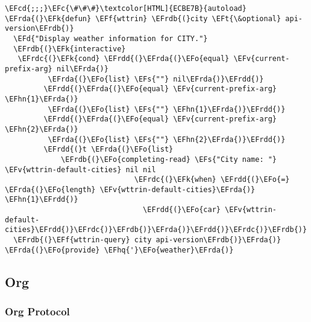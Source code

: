 \documentclass[a4wide,10pt]{article}
\newcommand{\EFc}[1]{\textcolor{EFc}{#1}} %
\newcommand{\EFcd}[1]{\textcolor{EFcd}{#1}} %
\newcommand{\EFs}[1]{\textcolor{EFs}{#1}} %
\newcommand{\EFd}[1]{\textcolor{EFd}{#1}} %
\newcommand{\EFk}[1]{\textcolor{EFk}{#1}} %
\newcommand{\EFf}[1]{\textcolor{EFf}{#1}} %
\newcommand{\EFv}[1]{\textcolor{EFv}{#1}} %
\newcommand{\EFt}[1]{\textcolor{EFt}{#1}} %
\newcommand{\EFo}[1]{\textcolor{EFo}{#1}} %
\newcommand{\EFhn}[1]{\textcolor{EFhn}{\textbf{#1}}} %
\newcommand{\EFhq}[1]{\textcolor{EFhq}{#1}} %
\newcommand{\EFrda}[1]{\textcolor{EFrda}{#1}} %
\newcommand{\EFrdb}[1]{\textcolor{EFrdb}{#1}} %
\newcommand{\EFrdc}[1]{\textcolor{EFrdc}{#1}} %
\newcommand{\EFrdd}[1]{\textcolor{EFrdd}{#1}} %
\begin{document}
\begin{Code}
\begin{Verbatim}
\EFcd{;;;}\EFc{\#\#\#}\textcolor[HTML]{ECBE7B}{autoload}
\EFrda{(}\EFk{defun} \EFf{wttrin} \EFrdb{(}city \EFt{\&optional} api-version\EFrdb{)}
  \EFd{"Display weather information for CITY."}
  \EFrdb{(}\EFk{interactive}
   \EFrdc{(}\EFk{cond} \EFrdd{(}\EFrda{(}\EFo{equal} \EFv{current-prefix-arg} nil\EFrda{)}
          \EFrda{(}\EFo{list} \EFs{""} nil\EFrda{)}\EFrdd{)}
         \EFrdd{(}\EFrda{(}\EFo{equal} \EFv{current-prefix-arg} \EFhn{1}\EFrda{)}
          \EFrda{(}\EFo{list} \EFs{""} \EFhn{1}\EFrda{)}\EFrdd{)}
         \EFrdd{(}\EFrda{(}\EFo{equal} \EFv{current-prefix-arg} \EFhn{2}\EFrda{)}
          \EFrda{(}\EFo{list} \EFs{""} \EFhn{2}\EFrda{)}\EFrdd{)}
         \EFrdd{(}t \EFrda{(}\EFo{list}
             \EFrdb{(}\EFo{completing-read} \EFs{"City name: "} \EFv{wttrin-default-cities} nil nil
                              \EFrdc{(}\EFk{when} \EFrdd{(}\EFo{=} \EFrda{(}\EFo{length} \EFv{wttrin-default-cities}\EFrda{)} \EFhn{1}\EFrdd{)}
                                \EFrdd{(}\EFo{car} \EFv{wttrin-default-cities}\EFrdd{)}\EFrdc{)}\EFrdb{)}\EFrda{)}\EFrdd{)}\EFrdc{)}\EFrdb{)}
  \EFrdb{(}\EFf{wttrin-query} city api-version\EFrdb{)}\EFrda{)}
\EFrda{(}\EFo{provide} \EFhq{'}\EFo{weather}\EFrda{)}
\end{Verbatim}
\end{Code}
\subsection{Org}
\label{sec:org7a8d1a0}
\subsubsection{Org Protocol}
\label{sec:org8d64adb}
\end{document}
